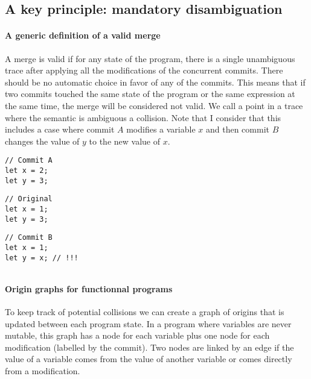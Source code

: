 \documentclass[a4paper,10pt]{article}
\begin{document}
\subsection{A key principle: mandatory disambiguation}
\paragraph{A generic definition of a valid merge} A merge is valid if for any state of the program, there is a single unambiguous trace after applying all the modifications of the concurrent commits. There should be no automatic choice in favor of any of the commits. This means that if two commits touched the same state of the program or the same expression at the same time, the merge will be considered not valid. We call a point in a trace where the semantic is ambiguous a collision.
Note that I consider that this includes a case where commit $A$ modifies a variable $x$ and then commit $B$ changes the value of $y$ to the new value of $x$.

\noindent
\begin{minipage}{.32\textwidth}
\begin{lstlisting}
// Commit A
let x = 2;
let y = 3;
\end{lstlisting}
\end{minipage}\hfill
\begin{minipage}{.32\textwidth}
\begin{lstlisting}
// Original
let x = 1;
let y = 3;
\end{lstlisting}
\end{minipage}\hfill
\begin{minipage}{.32\textwidth}
\begin{lstlisting}
// Commit B
let x = 1;
let y = x; // !!!
\end{lstlisting}
\end{minipage}
\vspace{-.4cm}
\begin{lstlisting}[label=lst:change_introducing_modified, caption={Colliding changes by using a variable modified by someone else}]
\end{lstlisting}

\paragraph{Origin graphs for functionnal programs} To keep track of potential collisions we can create a graph of origins that is updated between each program state. In a program where variables are never mutable, this graph has a node for each variable plus one node for each modification (labelled by the commit). Two nodes are linked by an edge if the value of a variable comes from the value of another variable or comes directly from a modification.
\end{document}

